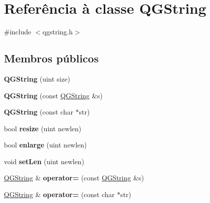 \hypertarget{class_q_g_string}{\section{Referência à classe Q\-G\-String}
\label{class_q_g_string}
}


{\ttfamily \#include $<$qgstring.\-h$>$}

\subsection*{Membros públicos}
\begin{DoxyCompactItemize}
\item 
\hypertarget{class_q_g_string_a4cf6df6db59158ee9a65c3d51e387ea4}{{\bfseries Q\-G\-String} (uint size)}\label{class_q_g_string_a4cf6df6db59158ee9a65c3d51e387ea4}

\item 
\hypertarget{class_q_g_string_a24a5eb03189090f39021935199dd9534}{{\bfseries Q\-G\-String} (const \hyperlink{class_q_g_string}{Q\-G\-String} \&s)}\label{class_q_g_string_a24a5eb03189090f39021935199dd9534}

\item 
\hypertarget{class_q_g_string_ac9697992665f446e28f3a3bf6ef0e8e7}{{\bfseries Q\-G\-String} (const char $\ast$str)}\label{class_q_g_string_ac9697992665f446e28f3a3bf6ef0e8e7}

\item 
\hypertarget{class_q_g_string_a378c0f518d23c55f949bd0dd39c87849}{bool {\bfseries resize} (uint newlen)}\label{class_q_g_string_a378c0f518d23c55f949bd0dd39c87849}

\item 
\hypertarget{class_q_g_string_ad1e1d91b8a9235c706459f0085a57ee2}{bool {\bfseries enlarge} (uint newlen)}\label{class_q_g_string_ad1e1d91b8a9235c706459f0085a57ee2}

\item 
\hypertarget{class_q_g_string_a800706b9ba7d8da3ad8a005931e31466}{void {\bfseries set\-Len} (uint newlen)}\label{class_q_g_string_a800706b9ba7d8da3ad8a005931e31466}

\item 
\hypertarget{class_q_g_string_a66c8ebe7671db2184b59b96e8c83fe55}{\hyperlink{class_q_g_string}{Q\-G\-String} \& {\bfseries operator=} (const \hyperlink{class_q_g_string}{Q\-G\-String} \&s)}\label{class_q_g_string_a66c8ebe7671db2184b59b96e8c83fe55}

\item 
\hypertarget{class_q_g_string_a58bd7d10a219b158c668b959ff19d1b5}{\hyperlink{class_q_g_string}{Q\-G\-String} \& {\bfseries operator=} (const char $\ast$str)}\label{class_q_g_string_a58bd7d10a219b158c668b959ff19d1b5}


\end{DoxyCompactItemize}
